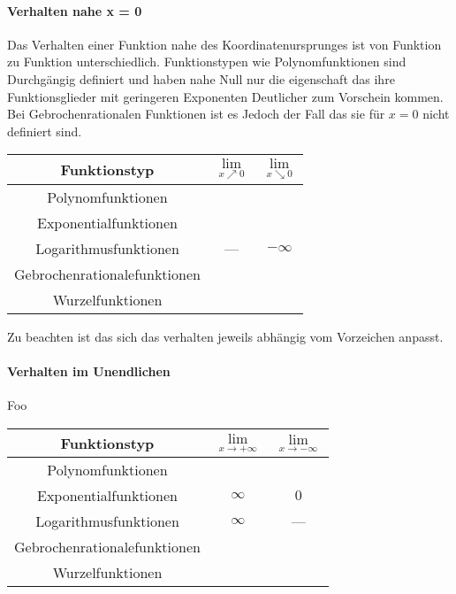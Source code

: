 \documentclass{article}
\begin{document}
		\paragraph{Verhalten nahe x = 0}\label{Verhalten nahe Null}
			Das Verhalten einer Funktion nahe des Koordinatenursprunges ist von Funktion zu Funktion unterschiedlich. Funktionstypen wie Polynomfunktionen sind Durchgängig definiert und haben nahe Null nur die eigenschaft das ihre Funktionsglieder mit geringeren Exponenten Deutlicher zum Vorschein kommen. Bei Gebrochenrationalen Funktionen ist es Jedoch der Fall das sie für $x = 0$ nicht definiert sind.\\
			
		\begin{tabular}{|c|c|c|}
			\hline 
			Funktionstyp & $\lim\limits_{x \nearrow 0}$& $\lim\limits_{x \searrow 0}$ \\
			\hline
			Polynomfunktionen & & \\
			\hline
			Exponentialfunktionen & & \\
			\hline
			Logarithmusfunktionen & --- & $- \infty$ \\
			\hline
			Gebrochenrationalefunktionen & & \\
			\hline
			Wurzelfunktionen & & \\ 
			\hline
		\end{tabular}
		 Zu beachten ist das sich das verhalten jeweils abhängig vom Vorzeichen anpasst.
		
		\paragraph{Verhalten im Unendlichen}\label{Verhalten Im unendlichen}
			Foo\\
		
				\begin{tabular}{|c|c|c|}
			\hline 
			Funktionstyp & $\lim\limits_{x \rightarrow + \infty}$& $\lim\limits_{x \rightarrow - \infty}$ \\
			\hline
			Polynomfunktionen & & \\
			\hline
			Exponentialfunktionen & $\infty$ & $0$ \\
			\hline
			Logarithmusfunktionen & $\infty$ & --- \\
			\hline
			Gebrochenrationalefunktionen & & \\
			\hline
			Wurzelfunktionen & & \\ 
			\hline
		\end{tabular}
		
\end{document}
